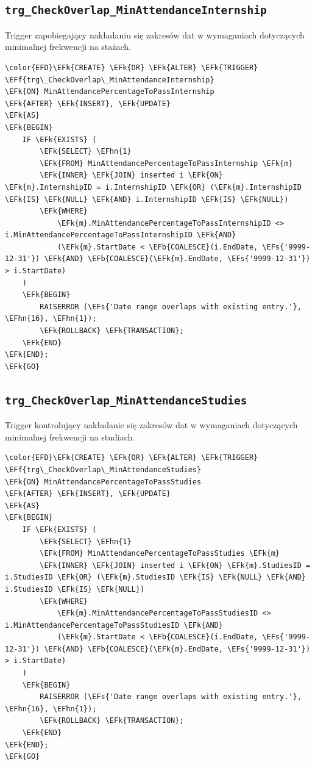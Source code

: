 \documentclass[11pt]{article}
\newcommand{\EFs}[1]{\textcolor{EFs}{#1}} %
\newcommand{\EFk}[1]{\textcolor{EFk}{\textbf{#1}}} %
\newcommand{\EFb}[1]{\textcolor{EFb}{\textbf{#1}}} %
\newcommand{\EFf}[1]{\textcolor{EFf}{#1}} %
\newcommand{\EFhn}[1]{\textcolor{EFhn}{#1}} %
\begin{document}
\subsection{\texttt{trg\_CheckOverlap\_MinAttendanceInternship}}
\label{sec:org6a54a0e}
Trigger zapobiegający nakładaniu się zakresów dat w wymaganiach dotyczących minimalnej frekwencji na stażach.
\begin{Code}
\begin{Verbatim}
\color{EFD}\EFk{CREATE} \EFk{OR} \EFk{ALTER} \EFk{TRIGGER} \EFf{trg\_CheckOverlap\_MinAttendanceInternship}
\EFk{ON} MinAttendancePercentageToPassInternship
\EFk{AFTER} \EFk{INSERT}, \EFk{UPDATE}
\EFk{AS}
\EFk{BEGIN}
    IF \EFk{EXISTS} (
        \EFk{SELECT} \EFhn{1} 
        \EFk{FROM} MinAttendancePercentageToPassInternship \EFk{m}
        \EFk{INNER} \EFk{JOIN} inserted i \EFk{ON} \EFk{m}.InternshipID = i.InternshipID \EFk{OR} (\EFk{m}.InternshipID \EFk{IS} \EFk{NULL} \EFk{AND} i.InternshipID \EFk{IS} \EFk{NULL})
        \EFk{WHERE} 
            \EFk{m}.MinAttendancePercentageToPassInternshipID <> i.MinAttendancePercentageToPassInternshipID \EFk{AND}
            (\EFk{m}.StartDate < \EFb{COALESCE}(i.EndDate, \EFs{'9999-12-31'}) \EFk{AND} \EFb{COALESCE}(\EFk{m}.EndDate, \EFs{'9999-12-31'}) > i.StartDate)
    )
    \EFk{BEGIN}
        RAISERROR (\EFs{'Date range overlaps with existing entry.'}, \EFhn{16}, \EFhn{1});
        \EFk{ROLLBACK} \EFk{TRANSACTION};
    \EFk{END}
\EFk{END};
\EFk{GO}
\end{Verbatim}
\end{Code}
\subsection{\texttt{trg\_CheckOverlap\_MinAttendanceStudies}}
\label{sec:org1536e7a}
Trigger kontrolujący nakładanie się zakresów dat w wymaganiach dotyczących minimalnej frekwencji na studiach.
\begin{Code}
\begin{Verbatim}
\color{EFD}\EFk{CREATE} \EFk{OR} \EFk{ALTER} \EFk{TRIGGER} \EFf{trg\_CheckOverlap\_MinAttendanceStudies}
\EFk{ON} MinAttendancePercentageToPassStudies
\EFk{AFTER} \EFk{INSERT}, \EFk{UPDATE}
\EFk{AS}
\EFk{BEGIN}
    IF \EFk{EXISTS} (
        \EFk{SELECT} \EFhn{1} 
        \EFk{FROM} MinAttendancePercentageToPassStudies \EFk{m}
        \EFk{INNER} \EFk{JOIN} inserted i \EFk{ON} \EFk{m}.StudiesID = i.StudiesID \EFk{OR} (\EFk{m}.StudiesID \EFk{IS} \EFk{NULL} \EFk{AND} i.StudiesID \EFk{IS} \EFk{NULL})
        \EFk{WHERE} 
            \EFk{m}.MinAttendancePercentageToPassStudiesID <> i.MinAttendancePercentageToPassStudiesID \EFk{AND}
            (\EFk{m}.StartDate < \EFb{COALESCE}(i.EndDate, \EFs{'9999-12-31'}) \EFk{AND} \EFb{COALESCE}(\EFk{m}.EndDate, \EFs{'9999-12-31'}) > i.StartDate)
    )
    \EFk{BEGIN}
        RAISERROR (\EFs{'Date range overlaps with existing entry.'}, \EFhn{16}, \EFhn{1});
        \EFk{ROLLBACK} \EFk{TRANSACTION};
    \EFk{END}
\EFk{END};
\EFk{GO}
\end{Verbatim}
\end{Code}
\end{document}
